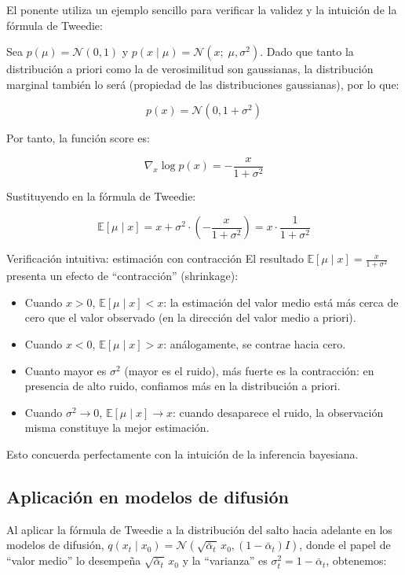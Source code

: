 El ponente utiliza un ejemplo sencillo para verificar la validez y la intuición de la fórmula de Tweedie:

Sea $p(\mu) = \mathcal{N}(0, 1)$ y $p(x \mid \mu) = \mathcal{N}(x;\; \mu, \sigma^2)$. Dado que tanto la distribución a priori como la de verosimilitud son gaussianas, la distribución marginal también lo será (propiedad de las distribuciones gaussianas), por lo que:

$$p(x) = \mathcal{N}(0, 1 + \sigma^2)$$

Por tanto, la función score es:

$$\nabla_x \log p(x) = -\frac{x}{1 + \sigma^2}$$

Sustituyendo en la fórmula de Tweedie:

$$\mathbb{E}[\mu \mid x] = x + \sigma^2 \cdot \left(-\frac{x}{1+\sigma^2}\right) = x \cdot \frac{1}{1+\sigma^2}$$

\begin{knowledgebox}{Verificación intuitiva: estimación con contracción}
El resultado $\mathbb{E}[\mu \mid x] = \frac{x}{1+\sigma^2}$ presenta un efecto de ``contracción'' (shrinkage):
\begin{itemize}
    \item Cuando $x > 0$, $\mathbb{E}[\mu \mid x] < x$: la estimación del valor medio está más cerca de cero que el valor observado (en la dirección del valor medio a priori).
    \item Cuando $x < 0$, $\mathbb{E}[\mu \mid x] > x$: análogamente, se contrae hacia cero.
    \item Cuanto mayor es $\sigma^2$ (mayor es el ruido), más fuerte es la contracción: en presencia de alto ruido, confiamos más en la distribución a priori.
    \item Cuando $\sigma^2 \to 0$, $\mathbb{E}[\mu \mid x] \to x$: cuando desaparece el ruido, la observación misma constituye la mejor estimación.
\end{itemize}
Esto concuerda perfectamente con la intuición de la inferencia bayesiana.
\end{knowledgebox}

\subsection{Aplicación en modelos de difusión}

Al aplicar la fórmula de Tweedie a la distribución del salto hacia adelante en los modelos de difusión, $q(x_t \mid x_0) = \mathcal{N}(\sqrt{\bar{\alpha}_t}\, x_0, (1-\bar{\alpha}_t)I)$, donde el papel de ``valor medio'' lo desempeña $\sqrt{\bar{\alpha}_t}\, x_0$ y la ``varianza'' es $\sigma_t^2 = 1-\bar{\alpha}_t$, obtenemos:

